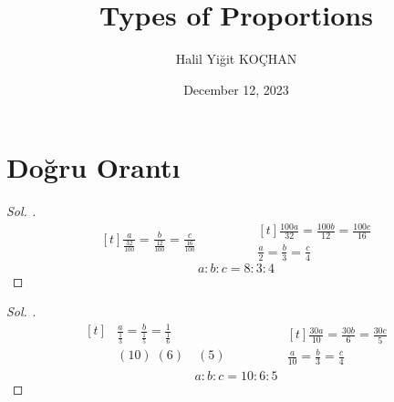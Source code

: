 \documentclass{article}
\title{Types of Proportions}
\author{Halil Yiğit KOÇHAN}
\date{December 12, 2023}
\theoremstyle{mytheoremstyle}
\theoremstyle{mytheoremstyle}
\theoremstyle{myproblemstyle}
\begin{document}
    \maketitle

\section{Doğru Orantı}


\begin{problem}[$ \frac{a}{0,32} = \frac{b}{0,12} = \frac{c}{0,16} $ ise $ a, b, c $ sırasıyla hangi tam sayılarla orantılıdır?]
\end{problem}

\begin{proof}[\textit{ Sol. }]
  \begin{equation*}
    \begin{aligned}[t]
      \frac{a}{\frac{32}{100}} = \frac{b}{\frac{12}{100}} = \frac{c}{\frac{16}{100}}
    \end{aligned}
    \qquad\qquad
    \begin{aligned}[t]
      \frac{100a}{32} = \frac{100b}{12} = \frac{100c}{16}\\
      \frac{a}{2} = \frac{b}{3} = \frac{c}{4}
    \end{aligned}
  \end{equation*}
  $$ a : b : c = 8 : 3 : 4 $$
\end{proof}

\pagebreak
\begin{problem}[$ 3a = 5b = 6c $ eşitliğine göre $ a, b, c $ hangi tamsayılarla orantılıdır?]
\end{problem}

\begin{proof}[\textit{ Sol. }]
  \begin{equation*}
    \begin{aligned}[t]
      &\frac{a}{\frac{1}{3}} = \frac{b}{\frac{1}{5}} = \frac{1}{\frac{1}{6}}\\
      &(10)\;(6)\quad(5)\\
    \end{aligned}
    \qquad\qquad
    \begin{aligned}[t]
      \frac{30a}{10} = \frac{30b}{6} = \frac{30c}{5}\\
      \frac{a}{10} = \frac{b}{3} = \frac{c}{4}
    \end{aligned}
  \end{equation*}
  $$ a : b : c = 10 : 6 : 5 $$
\end{proof}
\end{document}
